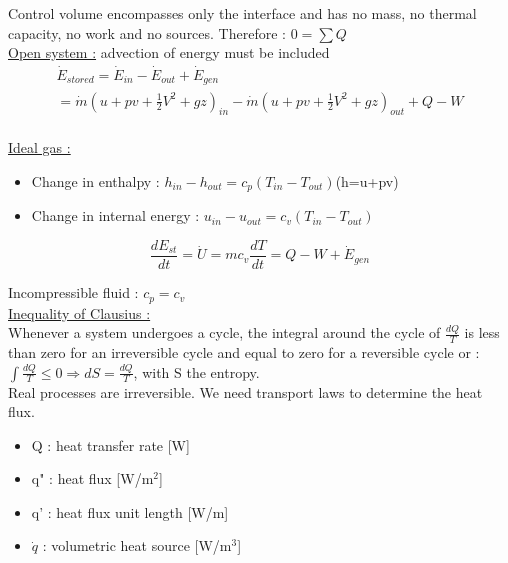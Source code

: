 \documentclass[../main.tex]{subfiles}
\begin{document}
Control volume encompasses only the interface and has no mass, no thermal capacity, no work and no sources. Therefore : $0 = \sum Q$\\

\quad \underline{Open system :} advection of energy must be included\\

\begin{equation}
    \begin{gathered}
        \Dot{E}_{stored} = \Dot{E}_{in} - \Dot{E}_{out} + \Dot{E}_{gen} \\
        = \dot{m} (u+pv + \frac{1}{2}V^2+gz)_{in} - \dot{m} (u+pv + \frac{1}{2}V^2+gz)_{out} +Q - W\\
    \end{gathered}
\end{equation}

\quad \underline{Ideal gas :}\\
\begin{itemize}
    \item Change in enthalpy : $h_{in}-h_{out} = c_p (T_{in}-T_{out})$(h=u+pv)\\
    \item Change in internal energy : $u_{in}-u_{out} = c_v (T_{in}-T_{out})$\\
\end{itemize}

\begin{equation}
    \frac{dE_{st}}{dt} = \dot{U} = mc_v \frac{dT}{dt} = Q-W+\dot{E}_{gen}
\end{equation}


Incompressible fluid : $c_p = c_v$\\

\quad \underline{Inequality of Clausius :}\\
Whenever a system undergoes a cycle, the integral around the cycle of $\frac{dQ}{T}$ is less than zero for an irreversible cycle and equal to zero for a reversible cycle or : $\int \frac{dQ}{T}\leq 0 \Rightarrow dS = \frac{dQ}{T}$, with S the entropy.\\

Real processes are irreversible. We need transport laws to determine the heat flux.\\

\begin{itemize}
    \item Q : heat transfer rate [W]\\
    \item q" : heat flux [W/m$^2$]\\
    \item q' : heat flux unit length [W/m]\\
    \item $\dot{q}$ : volumetric heat source [W/m$^3$]\\
\end{itemize}
\end{document}
